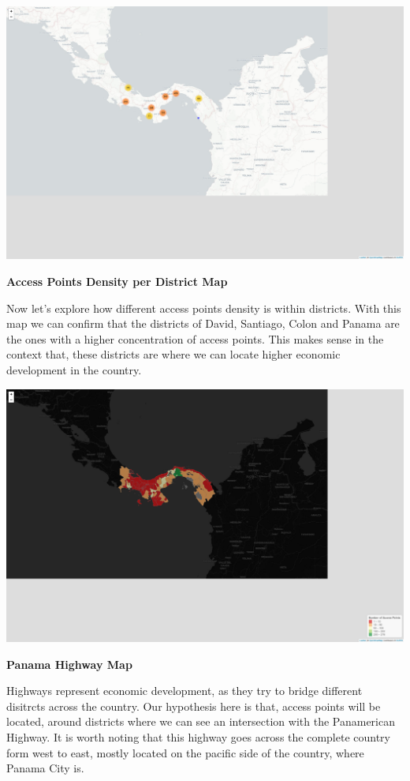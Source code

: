 \documentclass[
  letterpaper,
  DIV=11,
  numbers=noendperiod]{scrartcl}
\begin{document}
\includegraphics{index_files/figure-pdf/access-points-map-1.pdf}

\textbf{Access Points Density per District Map}

Now let's explore how different access points density is within
districts. With this map we can confirm that the districts of David,
Santiago, Colon and Panama are the ones with a higher concentration of
access points. This makes sense in the context that, these districts are
where we can locate higher economic development in the country.

\includegraphics{index_files/figure-pdf/district-data-access-points-1.pdf}

\textbf{Panama Highway Map}

Highways represent economic development, as they try to bridge different
disitrcts across the country. Our hypothesis here is that, access points
will be located, around districts where we can see an intersection with
the Panamerican Highway. It is worth noting that this highway goes
across the complete country form west to east, mostly located on the
pacific side of the country, where Panama City is.
\end{document}
